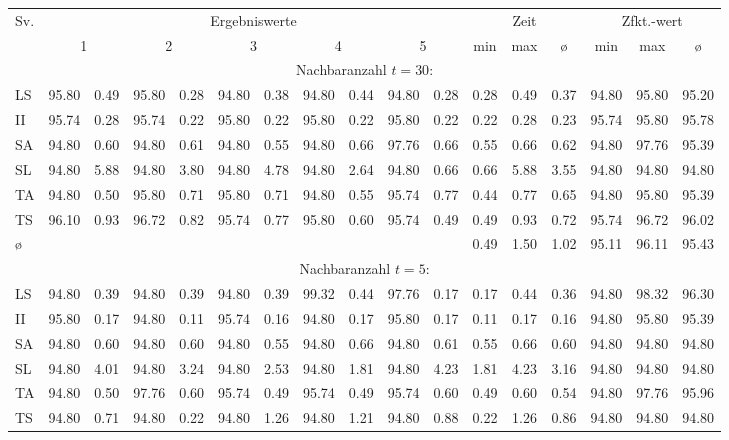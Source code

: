 {\footnotesize
\setlength\tabcolsep{0.75mm}
\begin{tabular}{l||rr|rr|rr|rr|rr||ccc||ccc}
Sv. & 
	\multicolumn{10}{c||}{{\normalsize Ergebniswerte} \rule[-1mm]{0mm}{5mm} } &
	\multicolumn{3}{c||}{{\normalsize Zeit}} & 
	\multicolumn{3}{c}{{\normalsize Zfkt.-wert}} \\ 
 &
	\multicolumn{2}{c|}{1} &
	\multicolumn{2}{c|}{2} &
	\multicolumn{2}{c|}{3} &
	\multicolumn{2}{c|}{4} &
	\multicolumn{2}{c||}{5} &
	min & max & {\o} & min & max & {\o}\\
\hline
\multicolumn{17}{c}{{\normalsize Nachbaranzahl $t=30$:}\rule[-2mm]{0mm}{8mm}}\\
\hline
LS&95.80&0.49&95.80&0.28&94.80&0.38&94.80&0.44&94.80&0.28&0.28&0.49&0.37&94.80&95.80&95.20\\
II&95.74&0.28&95.74&0.22&95.80&0.22&95.80&0.22&95.80&0.22&0.22&0.28&0.23&95.74&95.80&95.78\\
SA&94.80&0.60&94.80&0.61&94.80&0.55&94.80&0.66&97.76&0.66&0.55&0.66&0.62&94.80&97.76&95.39\\
SL&94.80&5.88&94.80&3.80&94.80&4.78&94.80&2.64&94.80&0.66&0.66&5.88&3.55&94.80&94.80&94.80\\
TA&94.80&0.50&95.80&0.71&95.80&0.71&94.80&0.55&95.74&0.77&0.44&0.77&0.65&94.80&95.80&95.39\\
TS&96.10&0.93&96.72&0.82&95.74&0.77&95.80&0.60&95.74&0.49&0.49&0.93&0.72&95.74&96.72&96.02\\
\hline
\multicolumn{1}{l}{{\o}} & \multicolumn{10}{c}{\quad} & 0.49&1.50&\multicolumn{1}{c}{1.02} & 95.11&96.11&95.43\\
\multicolumn{17}{c}{{\normalsize Nachbaranzahl $t=5$:}\rule[-2mm]{0mm}{8mm}}\\
\hline
LS&94.80&0.39&94.80&0.39&94.80&0.39&99.32&0.44&97.76&0.17&0.17&0.44&0.36&94.80&98.32&96.30\\
II&95.80&0.17&94.80&0.11&95.74&0.16&94.80&0.17&95.80&0.17&0.11&0.17&0.16&94.80&95.80&95.39\\
SA&94.80&0.60&94.80&0.60&94.80&0.55&94.80&0.66&94.80&0.61&0.55&0.66&0.60&94.80&94.80&94.80\\
SL&94.80&4.01&94.80&3.24&94.80&2.53&94.80&1.81&94.80&4.23&1.81&4.23&3.16&94.80&94.80&94.80\\
TA&94.80&0.50&97.76&0.60&95.74&0.49&95.74&0.49&95.74&0.60&0.49&0.60&0.54&94.80&97.76&95.96\\
TS&94.80&0.71&94.80&0.22&94.80&1.26&94.80&1.21&94.80&0.88&0.22&1.26&0.86&94.80&94.80&94.80\\

\end{tabular}}
